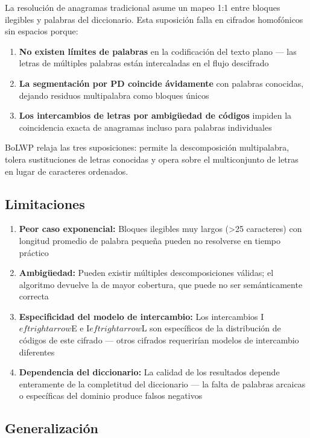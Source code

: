 \documentclass[11pt,a4paper]{article}
\begin{document}
La resolución de anagramas tradicional asume un mapeo 1:1 entre bloques ilegibles y palabras del diccionario. Esta suposición falla en cifrados homofónicos sin espacios porque:

\begin{enumerate}
\item \textbf{No existen límites de palabras} en la codificación del texto plano --- las letras de múltiples palabras están intercaladas en el flujo descifrado
\item \textbf{La segmentación por PD coincide ávidamente} con palabras conocidas, dejando residuos multipalabra como bloques únicos
\item \textbf{Los intercambios de letras por ambigüedad de códigos} impiden la coincidencia exacta de anagramas incluso para palabras individuales
\end{enumerate}

BoLWP relaja las tres suposiciones: permite la descomposición multipalabra, tolera sustituciones de letras conocidas y opera sobre el multiconjunto de letras en lugar de caracteres ordenados.

\subsection{Limitaciones}

\begin{enumerate}
\item \textbf{Peor caso exponencial:} Bloques ilegibles muy largos (>25 caracteres) con longitud promedio de palabra pequeña pueden no resolverse en tiempo práctico
\item \textbf{Ambigüedad:} Pueden existir múltiples descomposiciones válidas; el algoritmo devuelve la de mayor cobertura, que puede no ser semánticamente correcta
\item \textbf{Especificidad del modelo de intercambio:} Los intercambios I$eftrightarrow$E e I$eftrightarrow$L son específicos de la distribución de códigos de este cifrado --- otros cifrados requerirían modelos de intercambio diferentes
\item \textbf{Dependencia del diccionario:} La calidad de los resultados depende enteramente de la completitud del diccionario --- la falta de palabras arcaicas o específicas del dominio produce falsos negativos
\end{enumerate}

\subsection{Generalización}
\end{document}
